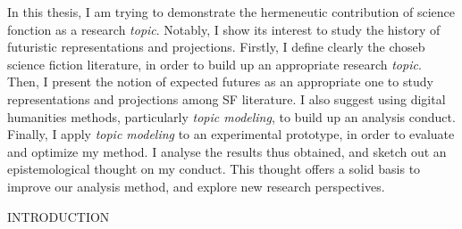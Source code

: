 \documentclass[letterpaper,portrait,12pt]{article}
\begin{document}
In this thesis, I am trying to demonstrate the hermeneutic contribution of science fonction as a research \emph{topic}. Notably, I show its interest to study the history of futuristic representations and projections. Firstly, I define clearly the choseb science fiction literature, in order to build up an appropriate research \emph{topic}. Then, I present the notion of expected futures as an appropriate one to study representations and projections among SF literature. I also suggest using digital humanities methods, particularly \emph{topic modeling}, to build up an analysis conduct. Finally, I apply \emph{topic modeling} to an experimental prototype, in order to evaluate and optimize my method. I analyse the results thus obtained, and sketch out an epistemological thought on my conduct. This thought offers a solid basis to improve our analysis method, and explore new research perspectives.
















































































INTRODUCTION
\end{document}
